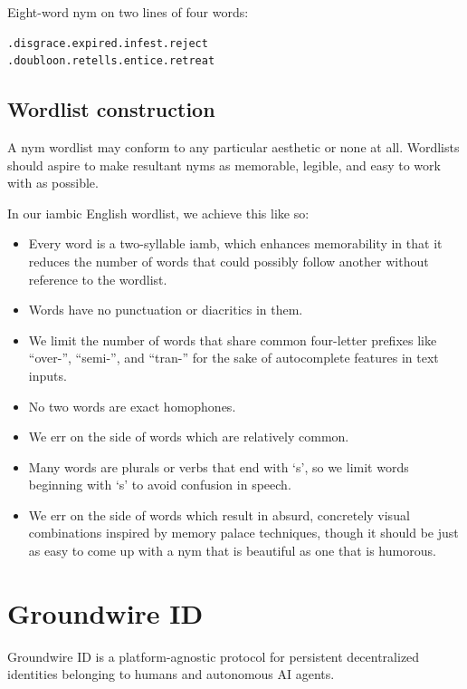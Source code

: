 \documentclass[twoside]{article}
\begin{document}
Eight-word nym on two lines of four words:

\begin{lstlisting}[style=listingcode]
.disgrace.expired.infest.reject
.doubloon.retells.entice.retreat
\end{lstlisting}

\subsection{Wordlist construction}\label{wordlist-construction}

A nym wordlist may conform to any particular aesthetic or none at all.
Wordlists should aspire to make resultant nyms as memorable, legible,
and easy to work with as possible.

In our iambic English wordlist, we achieve this like so:

\begin{itemize}[noitemsep,topsep=2pt]

\item
  Every word is a two-syllable iamb, which enhances memorability in that
  it reduces the number of words that could possibly follow another
  without reference to the wordlist.
\item
  Words have no punctuation or diacritics in them.
\item
  We limit the number of words that share common four-letter prefixes
  like ``over-'', ``semi-'', and ``tran-'' for the sake of
  autocomplete features in text inputs.
\item
  No two words are exact homophones.
\item
  We err on the side of words which are relatively common.
\item
  Many words are plurals or verbs that end with `s', so we limit words
  beginning with `s' to avoid confusion in speech.
\item
  We err on the side of words which result in absurd, concretely visual
  combinations inspired by memory palace techniques, though it should be
  just as easy to come up with a nym that is beautiful as one that is
  humorous.
\end{itemize}

\section{Groundwire ID}\label{groundwire-id}

Groundwire ID is a platform-agnostic protocol for persistent
decentralized identities belonging to humans and autonomous AI agents.
\end{document}
